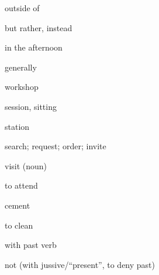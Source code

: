 \documentclass[avery5371,grid,frame]{flashcards}
\begin{document}
\begin{flashcard}{\LARGE outside of}
\LARGE {}
\end{flashcard}
\begin{flashcard}{\LARGE but rather, instead}
\LARGE {}
\end{flashcard}
\begin{flashcard}{\LARGE in the afternoon}
\LARGE {}
\end{flashcard}
\begin{flashcard}{\LARGE generally}
\LARGE {}
\end{flashcard}
\begin{flashcard}{\LARGE workshop}
\LARGE {}
\end{flashcard}
\begin{flashcard}{\LARGE session, sitting}
\LARGE {}
\end{flashcard}
\begin{flashcard}{\LARGE station}
\LARGE {}
\end{flashcard}
\begin{flashcard}{\LARGE search; request; order; invite}
\LARGE {}
\end{flashcard}
\begin{flashcard}{\LARGE visit (noun)}
\LARGE {}
\end{flashcard}
\begin{flashcard}{\LARGE to attend}
\LARGE {}
\end{flashcard}
\begin{flashcard}{\LARGE cement}
\LARGE {}
\end{flashcard}
\begin{flashcard}{\LARGE to clean}
\LARGE {}
\end{flashcard}
\begin{flashcard}{\LARGE with past verb}
\LARGE {}
\end{flashcard}
\begin{flashcard}{\LARGE not (with jussive/``present'', to deny past)}
\LARGE {}
\end{flashcard}
\end{document}

